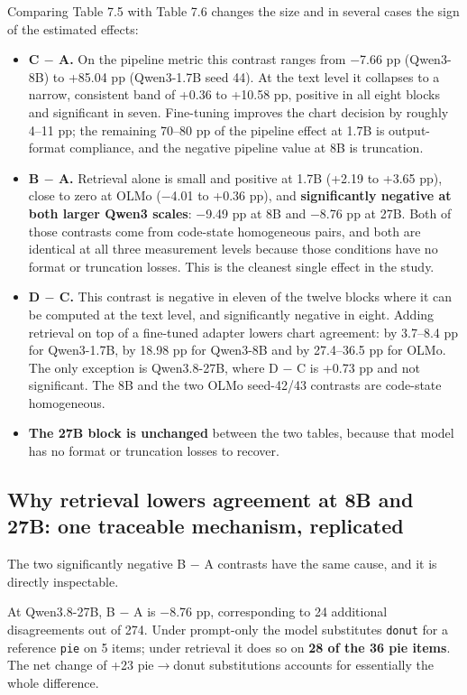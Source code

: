 Comparing Table 7.5 with Table 7.6 changes the size and in several cases the sign of the estimated effects:

\begin{itemize}
\tightlist
\item
  \textbf{C \ensuremath{-} A.} On the pipeline metric this contrast ranges from \ensuremath{-}7.66 pp (Qwen3-8B) to +85.04 pp (Qwen3-1.7B seed 44). At the text level it collapses to a narrow, consistent band of +0.36 to +10.58 pp, positive in all eight blocks and significant in seven. Fine-tuning improves the chart decision by roughly 4--11 pp; the remaining 70--80 pp of the pipeline effect at 1.7B is output-format compliance, and the negative pipeline value at 8B is truncation.
\item
  \textbf{B \ensuremath{-} A.} Retrieval alone is small and positive at 1.7B (+2.19 to +3.65 pp), close to zero at OLMo (\ensuremath{-}4.01 to +0.36 pp), and \textbf{significantly negative at both larger Qwen3 scales}: \ensuremath{-}9.49 pp at 8B and \ensuremath{-}8.76 pp at 27B. Both of those contrasts come from code-state homogeneous pairs, and both are identical at all three measurement levels because those conditions have no format or truncation losses. This is the cleanest single effect in the study.
\item
  \textbf{D \ensuremath{-} C.} This contrast is negative in eleven of the twelve blocks where it can be computed at the text level, and significantly negative in eight. Adding retrieval on top of a fine-tuned adapter lowers chart agreement: by 3.7--8.4 pp for Qwen3-1.7B, by 18.98 pp for Qwen3-8B and by 27.4--36.5 pp for OLMo. The only exception is Qwen3.8-27B, where D \ensuremath{-} C is +0.73 pp and not significant. The 8B and the two OLMo seed-42/43 contrasts are code-state homogeneous.
\item
  \textbf{The 27B block is unchanged} between the two tables, because that model has no format or truncation losses to recover.
\end{itemize}

\subsection{Why retrieval lowers agreement at 8B and 27B: one traceable mechanism, replicated}

The two significantly negative B \ensuremath{-} A contrasts have the same cause, and it is directly inspectable.

At Qwen3.8-27B, B \ensuremath{-} A is \ensuremath{-}8.76 pp, corresponding to 24 additional disagreements out of 274. Under prompt-only the model substitutes \texttt{donut} for a reference \texttt{pie} on 5 items; under retrieval it does so on \textbf{28 of the 36 pie items}. The net change of +23 pie\(\rightarrow\)donut substitutions accounts for essentially the whole difference.

